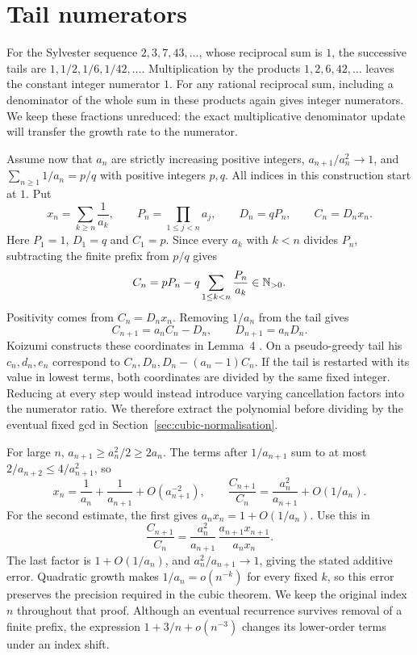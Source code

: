\documentclass[11pt]{article}
\begin{document}
\section{Tail numerators}\label{sec:transfer}\label{sec:state}
For the Sylvester sequence $2,3,7,43,\ldots$, whose reciprocal sum is
$1$, the successive tails are $1,1/2,1/6,1/42,\ldots$. Multiplication
by the products $1,2,6,42,\ldots$ leaves the constant integer numerator
$1$. For any rational reciprocal sum, including a denominator of the whole
sum in these products again gives integer numerators. We keep these
fractions unreduced: the exact multiplicative denominator update will
transfer the growth rate to the numerator.

Assume now that $a_n$ are strictly increasing positive integers,
$a_{n+1}/a_n^2\to1$, and $\sum_{n\ge1}1/a_n=p/q$ with positive integers
$p,q$. All indices in this construction start at $1$. Put
\[
 x_n=\sum_{k\ge n}\frac1{a_k},\qquad
 P_n=\prod_{1\le j<n}a_j,\qquad D_n=qP_n,\qquad C_n=D_nx_n.
\]
Here $P_1=1$, $D_1=q$ and $C_1=p$. Since every $a_k$ with $k<n$
divides $P_n$, subtracting the finite prefix from $p/q$ gives
\[
 C_n=pP_n-q\sum_{1\le k<n}\frac{P_n}{a_k}\in\mathbb{N}_{>0}.
\]
Positivity comes from $C_n=D_nx_n$. Removing $1/a_n$ from the tail gives
\begin{equation}\label{eq:recurrences}
 C_{n+1}=a_nC_n-D_n,\qquad D_{n+1}=a_nD_n.
\end{equation}
Koizumi constructs these coordinates in Lemma~4
\cite[pp.~11--12]{koizumi2025}. On a pseudo-greedy tail his
$c_n,d_n,e_n$ correspond to $C_n,D_n,D_n-(a_n-1)C_n$. If the tail
is restarted with its value in lowest terms, both coordinates are
divided by the same fixed integer. Reducing at every step would instead
introduce varying cancellation factors into the numerator ratio. We
therefore extract the polynomial before dividing by the eventual fixed
gcd in Section~\ref{sec:cubic-normalisation}.

For large $n$, $a_{n+1}\ge a_n^2/2\ge2a_n$. The terms after
$1/a_{n+1}$ sum to at most $2/a_{n+2}\le4/a_{n+1}^2$, so
\begin{equation}\label{eq:tail-estimate}
 x_n=\frac1{a_n}+\frac1{a_{n+1}}+O(a_{n+1}^{-2}),
 \qquad
 \frac{C_{n+1}}{C_n}=\frac{a_n^2}{a_{n+1}}+O(1/a_n).
\end{equation}
For the second estimate, the first gives $a_nx_n=1+O(1/a_n)$. Use this in
\[
 \frac{C_{n+1}}{C_n}
 =\frac{a_n^2}{a_{n+1}}\,
  \frac{a_{n+1}x_{n+1}}{a_nx_n}.
\]
The last factor is $1+O(1/a_n)$, and $a_n^2/a_{n+1}\to1$, giving the
stated additive error. Quadratic growth makes $1/a_n=o(n^{-k})$ for every fixed $k$,
so this error preserves the precision required in the cubic theorem.
We keep the original index $n$ throughout that proof. Although an
eventual recurrence survives removal of a finite prefix, the expression
$1+3/n+o(n^{-3})$ changes its lower-order terms under an index shift.
\end{document}
